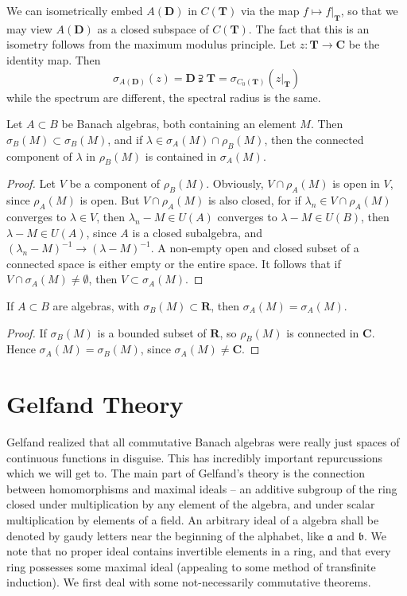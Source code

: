 \begin{example}
    We can isometrically embed $A(\mathbf{D})$ in $C(\mathbf{T})$ via the map $f \mapsto f|_\mathbf{T}$, so that we may view $A(\mathbf{D})$ as a closed subspace of $C(\mathbf{T})$. The fact that this is an isometry follows from the maximum modulus principle. Let $z: \mathbf{T} \to \mathbf{C}$ be the identity map. Then
    \[ \sigma_{A(\mathbf{D})}(z) = \mathbf{D} \supsetneqq \mathbf{T} = \sigma_{C_0(\mathbf{T})}(z|_\mathbf{T}) \]
    while the spectrum are different, the spectral radius is the same.
\end{example}

\begin{theorem}
    Let $A \subset B$ be Banach algebras, both containing an element $M$. Then $\sigma_B(M) \subset \sigma_B(M)$, and if $\lambda \in \sigma_A(M) \cap \rho_B(M)$, then the connected component of $\lambda$ in $\rho_B(M)$ is contained in $\sigma_A(M)$.
\end{theorem}
\begin{proof}
    Let $V$ be a component of $\rho_B(M)$. Obviously, $V \cap \rho_A(M)$ is open in $V$, since $\rho_A(M)$ is open. But $V \cap \rho_A(M)$ is also closed, for if $\lambda_n \in V \cap \rho_A(M)$ converges to $\lambda \in V$, then $\lambda_n - M \in U(A)$ converges to $\lambda - M \in U(B)$, then $\lambda - M \in U(A)$, since $A$ is a closed subalgebra, and $(\lambda_n - M)^{-1} \to (\lambda - M)^{-1}$. A non-empty open and closed subset of a connected space is either empty or the entire space. It follows that if $V \cap \sigma_A(M) \neq \emptyset$, then $V \subset \sigma_A(M)$.
\end{proof}

\begin{corollary}
    If $A \subset B$ are algebras, with $\sigma_B(M) \subset \mathbf{R}$, then $\sigma_A(M) = \sigma_A(M)$.
\end{corollary}
\begin{proof}
    If $\sigma_B(M)$ is a bounded subset of $\mathbf{R}$, so $\rho_B(M)$ is connected in $\mathbf{C}$. Hence $\sigma_A(M) = \sigma_B(M)$, since $\sigma_A(M) \neq \mathbf{C}$.
\end{proof}

\section{Gelfand Theory}

Gelfand realized that all commutative Banach algebras were really just spaces of continuous functions in disguise. This has incredibly important repurcussions which we will get to. The main part of Gelfand's theory is the connection between homomorphisms and maximal ideals -- an additive subgroup of the ring closed under multiplication by any element of the algebra, and under scalar multiplication by elements of a field. An arbitrary ideal of a algebra shall be denoted by gaudy letters near the beginning of the alphabet, like $\mathfrak{a}$ and $\mathfrak{b}$. We note that no proper ideal contains invertible elements in a ring, and that every ring possesses some maximal ideal (appealing to some method of transfinite induction). We first deal with some not-necessarily commutative theorems.

